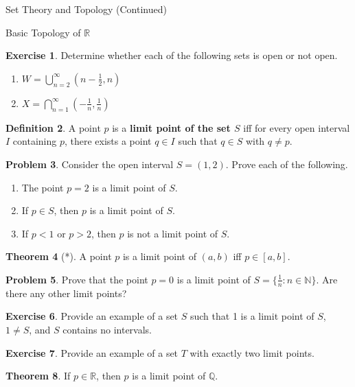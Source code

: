 \documentclass[11pt]{article}
\theoremstyle{definition}
\newtheorem{theorem}{Theorem}[section]
\newtheorem{definition}[theorem]{Definition}
\newtheorem{exercise}[theorem]{Exercise}
\newtheorem{problem}[theorem]{Problem}
\begin{document}
\begin{section}{Set Theory and Topology (Continued)}
\begin{subsection}{Basic Topology of $\mathbb{R}$}
\begin{exercise}
Determine whether each of the following sets is open or not open.
\begin{enumerate}
\item $\displaystyle W=\bigcup_{n=2}^{\infty} \left(n - \frac{1}{2},n\right)$
\item $\displaystyle X=\bigcap_{n=1}^{\infty} \left(-\frac{1}{n}, \frac{1}{n}\right)$
\end{enumerate}
\end{exercise}

\begin{definition}
A point $p$ is a \textbf{limit point of the set $S$} iff for every open interval $I$ containing $p$, there exists a point $q \in I$ such that $q \in S$ with $q\neq p$.
\end{definition}

\begin{problem}
Consider the open interval $S=(1,2)$. Prove each of the following.
\begin{enumerate}
\item The point $p=2$ is a limit point of $S$.
\item If $p\in S$, then $p$ is a limit point of $S$.
\item If $p<1$ or $p>2$, then $p$ is not a limit point of $S$.
\end{enumerate}
\end{problem}

\begin{theorem}[*]
A point $p$ is a limit point of $(a,b)$ iff $p\in [a,b]$.
\end{theorem}

\begin{problem}
Prove that the point $p=0$ is a limit point of $S=\{\frac{1}{n}: n \in \mathbb{N}\}$.  Are there any other limit points?
\end{problem}

\begin{exercise}
Provide an example of a set $S$ such that 1 is a limit point of $S$, $1\neq S$, and $S$ contains no intervals.
\end{exercise}

\begin{exercise}
Provide an example of a set $T$ with exactly two limit points.
\end{exercise}

\begin{theorem}
If $p\in\mathbb{R}$, then $p$ is a limit point of $\mathbb{Q}$.
\end{theorem}


\end{subsection}
\end{section}
\end{document}
